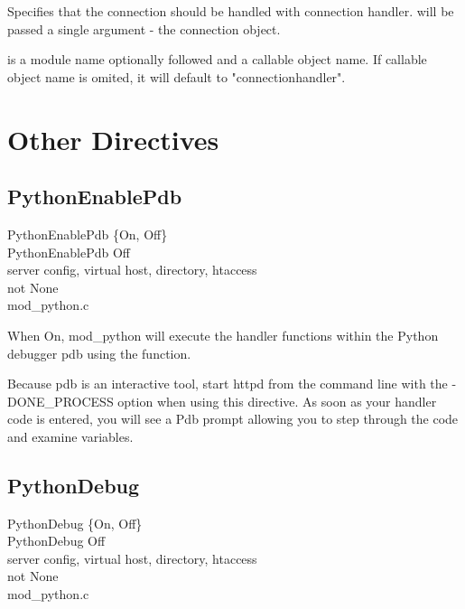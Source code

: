 Specifies that the connection should be handled with 
connection handler.  will be passed a single argument -
the connection object.

 is a module name optionally followed \code{::} and a
callable object name. If callable object name is omited, it will
default to "connectionhandler".

\section{Other Directives\label{dir-other}}

\subsection{PythonEnablePdb\label{dir-other-epd}}

PythonEnablePdb \{On, Off\} \\
PythonEnablePdb Off\\
server config, virtual host, directory, htaccess\\
not None\\
mod_python.c

When On, mod_python will execute the handler functions within the
Python debugger pdb using the  function.

Because pdb is an interactive tool, start httpd from the command line
with the -DONE_PROCESS option when using this directive. As soon as
your handler code is entered, you will see a Pdb prompt allowing you
to step through the code and examine variables.

\subsection{PythonDebug\label{dir-other-pd}}

PythonDebug \{On, Off\} \\
PythonDebug Off\\
server config, virtual host, directory, htaccess\\
not None\\
mod_python.c


